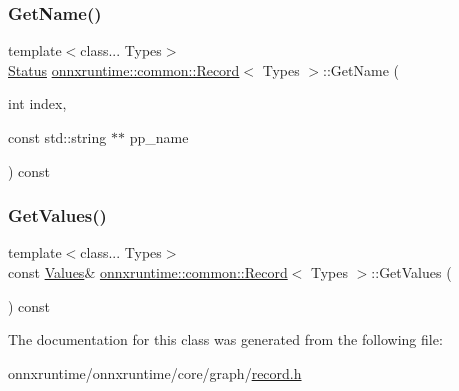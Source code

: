 \subsubsection{\texorpdfstring{Get\+Name()}{GetName()}}
{\footnotesize\ttfamily template$<$class... Types$>$ \\
\mbox{\hyperlink{classonnxruntime_1_1common_1_1Status}{Status}} \mbox{\hyperlink{classonnxruntime_1_1common_1_1Record}{onnxruntime\+::common\+::\+Record}}$<$ Types $>$\+::Get\+Name (\begin{DoxyParamCaption}\item[{int}]{index,  }\item[{const std\+::string $\ast$$\ast$}]{pp\+\_\+name }\end{DoxyParamCaption}) const\hspace{0.3cm}{\ttfamily [inline]}}

\mbox{\label{classonnxruntime_1_1common_1_1Record_ac05fe4d52b275bf655b5d18503c6b0b5}} 
\subsubsection{\texorpdfstring{Get\+Values()}{GetValues()}}
{\footnotesize\ttfamily template$<$class... Types$>$ \\
const \mbox{\hyperlink{classonnxruntime_1_1common_1_1Record_adf21ddd0ae1bfd54963165bde0b417d7}{Values}}\& \mbox{\hyperlink{classonnxruntime_1_1common_1_1Record}{onnxruntime\+::common\+::\+Record}}$<$ Types $>$\+::Get\+Values (\begin{DoxyParamCaption}{ }\end{DoxyParamCaption}) const\hspace{0.3cm}{\ttfamily [inline]}}



The documentation for this class was generated from the following file\+:\begin{DoxyCompactItemize}
\item 
onnxruntime/onnxruntime/core/graph/\mbox{\hyperlink{record_8h}{record.\+h}}\end{DoxyCompactItemize}
